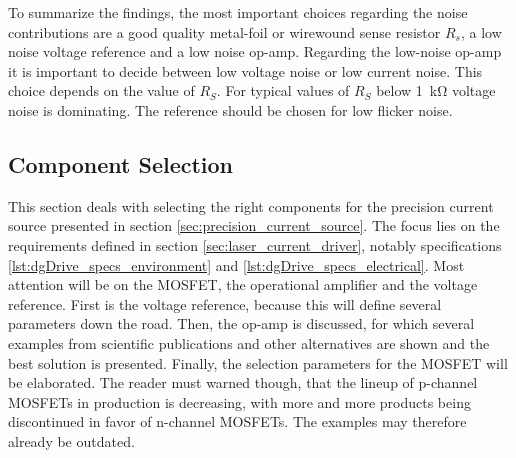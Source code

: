 To summarize the findings, the most important choices regarding the noise contributions are a good quality metal-foil or wirewound sense resistor $R_s$, a low noise voltage reference and a low noise op-amp. Regarding the low-noise op-amp it is important to decide between low voltage noise or low current noise. This choice depends on the value of $R_S$. For typical values of $R_S$ below \qty{1}{\kilo\ohm} voltage noise is dominating. The reference should be chosen for low flicker noise.

\clearpage
\subsection{Component Selection}%
\label{sec:component_selection}
This section deals with selecting the right components for the precision current source presented in section \ref{sec:precision_current_source}. The focus lies on the requirements defined in section \ref{sec:laser_current_driver}, notably specifications \ref{lst:dgDrive_specs_environment} and \ref{lst:dgDrive_specs_electrical}. Most attention will be on the MOSFET, the operational amplifier and the voltage reference. First is the voltage reference, because this will define several parameters down the road. Then, the op-amp is discussed, for which several examples from scientific publications and other alternatives are shown and the best solution is presented. Finally, the selection parameters for the MOSFET will be elaborated. The reader must warned though, that the lineup of p-channel MOSFETs in production is decreasing, with more and more products being discontinued in favor of n-channel MOSFETs. The examples may therefore already be outdated.

